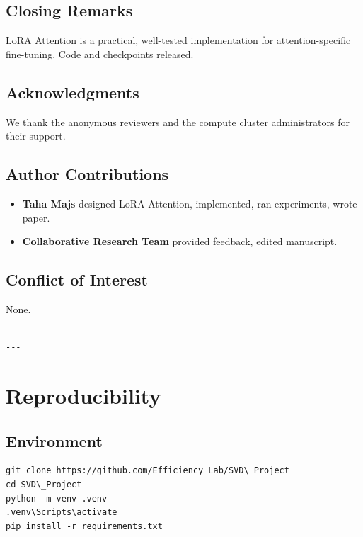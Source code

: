 \subsection{Closing Remarks}

LoRA Attention is a practical, well-tested implementation for 
attention-specific fine-tuning. Code and checkpoints released.

\subsection{Acknowledgments}

We thank the anonymous reviewers and the compute cluster administrators for their support.

\subsection{Author Contributions}

\begin{itemize}
\item \textbf{Taha Majs} designed LoRA Attention, implemented, ran experiments,
  wrote paper.
\item \textbf{Collaborative Research Team} provided feedback, edited manuscript.

\end{itemize}
\subsection{Conflict of Interest}

None.
\begin{lstlisting}

---
\end{lstlisting}

\section{Reproducibility}

\subsection{Environment}

\begin{lstlisting}
git clone https://github.com/Efficiency Lab/SVD\_Project
cd SVD\_Project
python -m venv .venv
.venv\Scripts\activate
pip install -r requirements.txt
\end{lstlisting}


